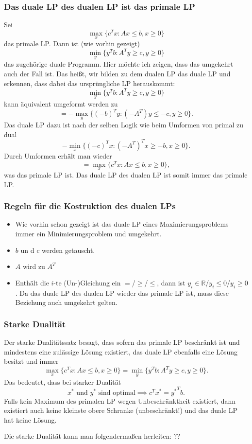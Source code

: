 \documentclass{article}
\begin{document}
\subsubsection{Das duale LP des dualen LP ist das primale LP}
Sei \[
\max_x\{c^Tx:Ax\leq b,x\geq0\}
\]das primale LP. Dann ist (wie vorhin gezeigt) \[
\min_y\{y^Tb:A^Ty\geq c, y\geq0\}
\]das zugehörige duale Programm. Hier möchte ich zeigen, dass das umgekehrt auch der Fall ist. Das heißt, wir bilden zu dem dualen LP das duale LP und erkennen, dass dabei das ursprüngliche LP herauskommt:\[
\min_y\{y^Tb:A^Ty\geq c, y\geq0\}
\]kann äquivalent umgeformt werden zu\[ 
= -\max_y\{(-b)^Ty:(-A^T)y\leq -c, y\geq0\}.
\]Das duale LP dazu ist nach der selben Logik wie beim Umformen von primal zu dual\[
-\min_x\{(-c)^Tx:(-A^T)^Tx\geq-b,x\geq0\}.
\]Durch Umformen erhält man wieder\[
=\max_x\{c^Tx:Ax\leq b,x\geq0\},
\]was das primale LP ist. Das duale LP des dualen LP ist somit immer das primale LP.

\subsubsection{Regeln für die Kostruktion des dualen LPs}
\begin{itemize}
    \item Wie vorhin schon gezeigt ist das duale LP eines Maximierungsproblems immer ein Minimierungsproblem und umgekehrt. 
    \item \(b\) un d \(c\) werden getauscht.
    \item \(A\) wird zu \(A^T\)
    \item Enthält die \(i\)-te (Un-)Gleichung ein \(=\)/\(\geq\)/\(\leq\), dann ist \(y_i\in\mathbb R\)/\(y_i\leq0\)/\(y_i\geq0\). Da das duale LP des dualen LP wieder das primale LP ist, muss diese Beziehung auch umgekehrt gelten.
    
\end{itemize}




\subsubsection{Starke Dualität}
Der starke Dualitätssatz besagt, dass sofern das primale LP beschränkt ist und mindestens eine zulässige Lösung existiert, das duale LP ebenfalls eine Lösung besitzt und immer\[
\max_x\{c^Tx:Ax\leq b,x\geq0\} = \min_y\{y^Tb:A^Ty\geq c, y\geq0\}.
\]Das bedeutet, dass bei starker Dualität\[
x^* \text{ und } y^*\text{ sind optimal} \implies c^Tx^*={y^*}^Tb.
\]Falls kein Maximum des primalen LP wegen Unbeschränktheit existiert, dann existiert auch keine kleinste obere Schranke (unbeschränkt!) und das duale LP hat keine Lösung.

Die starke Dualität kann man folgendermaßen herleiten: ??
\end{document}
